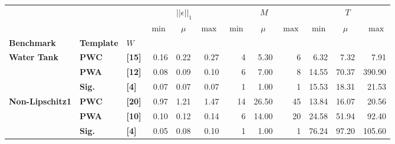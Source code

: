 \begin{tabular}{@{} lll rrr rrr rrr @{}}
    \toprule
                            &                   &                  & \multicolumn{3}{c}{$||\epsilon||_1$} & \multicolumn{3}{c}{$M$}   & \multicolumn{3}{c}{$T$}                                                                                              \\ \cmidrule(lr){4-6} \cmidrule(lr){7-9} \cmidrule(lr){10-12}
                            &                   &                  & $\min$                               & \multicolumn{1}{c}{$\mu$} & $\max$                  & $\min$ & \multicolumn{1}{c}{$\mu$} & $\max$ & $\min$ & \multicolumn{1}{c}{$\mu$} & $\max$  \\
    \textbf{Benchmark}      & \textbf{Template} & \textbf{$W$}     &                                      &                           &                         &        &                           &        &        &                           &         \\
    \midrule
    \textbf{Water Tank}     & \textbf{PWC}      & \textbf{[15]}    & 0.16                                 & 0.22                      & 0.27                    & 4      & 5.30                      & 6      & 6.32   & 7.32                      & 7.91    \\
                            & \textbf{PWA}      & \textbf{[12]}    & 0.08                                 & 0.09                      & 0.10                    & 6      & 7.00                      & 8      & 14.55  & 70.37                     & 390.90  \\
                            & \textbf{Sig.}     & \textbf{[4]}     & 0.07                                 & 0.07                      & 0.07                    & 1      & 1.00                      & 1      & 15.53  & 18.31                     & 21.53   \\
    \midrule
    \textbf{Non-Lipschitz1} & \textbf{PWC}      & \textbf{[20]}    & 0.97                                 & 1.21                      & 1.47                    & 14     & 26.50                     & 45     & 13.84  & 16.07                     & 20.56   \\
                            & \textbf{PWA}      & \textbf{[10]}    & 0.10                                 & 0.12                      & 0.14                    & 6      & 14.00                     & 20     & 24.58  & 51.94                     & 92.40   \\
                            & \textbf{Sig.}     & \textbf{[4]}     & 0.05                                 & 0.08                      & 0.10                    & 1      & 1.00                      & 1      & 76.24  & 97.20                     & 105.60  \\

\end{tabular}
